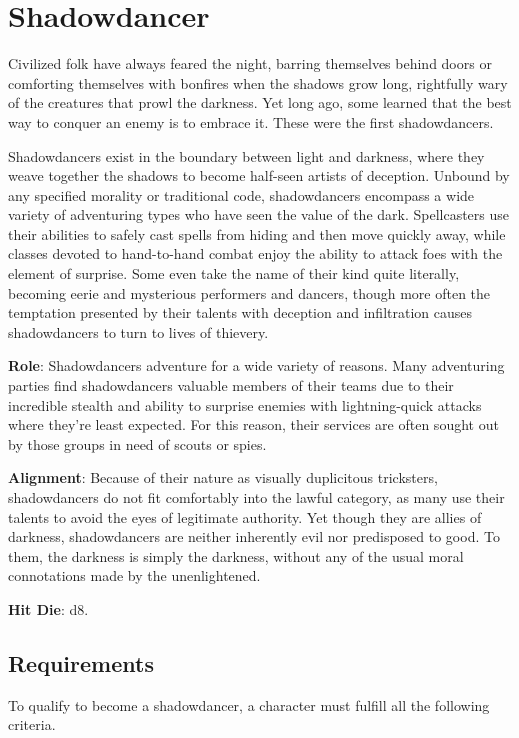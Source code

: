 \section{Shadowdancer}

\label{f0}				
Civilized folk have always feared the night, barring themselves behind doors or comforting themselves with bonfires when the shadows grow long, rightfully wary of the creatures that prowl the darkness. Yet long ago, some learned that the best way to conquer an enemy is to embrace it. These were the first shadowdancers.
				
Shadowdancers exist in the boundary between light and darkness, where they weave together the shadows to become half-seen artists of deception. Unbound by any specified morality or traditional code, shadowdancers encompass a wide variety of adventuring types who have seen the value of the dark. Spellcasters use their abilities to safely cast spells from hiding and then move quickly away, while classes devoted to hand-to-hand combat enjoy the ability to attack foes with the element of surprise. Some even take the name of their kind quite literally, becoming eerie and mysterious performers and dancers, though more often the temptation presented by their talents with deception and infiltration causes shadowdancers to turn to lives of thievery.
				
\textbf{Role}: Shadowdancers adventure for a wide variety of reasons. Many adventuring parties find shadowdancers valuable members of their teams due to their incredible stealth and ability to surprise enemies with lightning-quick attacks where they're least expected. For this reason, their services are often sought out by those groups in need of scouts or spies. 
				
\textbf{Alignment}: Because of their nature as visually duplicitous tricksters, shadowdancers do not fit comfortably into the lawful category, as many use their talents to avoid the eyes of legitimate authority. Yet though they are allies of darkness, shadowdancers are neither inherently evil nor predisposed to good. To them, the darkness is simply the darkness, without any of the usual moral connotations made by the unenlightened. 
				
\textbf{Hit Die}: d8.
				
\subsection{Requirements}

				
To qualify to become a shadowdancer, a character must fulfill all the following criteria.
				
